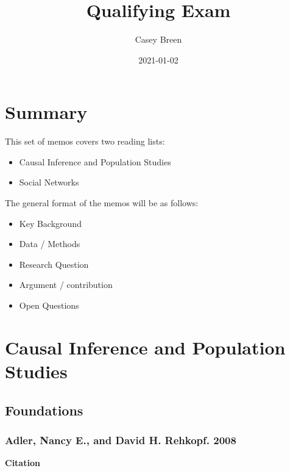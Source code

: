 \documentclass[
]{book}
\title{Qualifying Exam}
\author{Casey Breen}
\date{2021-01-02}
\providecommand{\tightlist}{%
  \setlength{\itemsep}{0pt}\setlength{\parskip}{0pt}}
\begin{document}
\maketitle

{
\setcounter{tocdepth}{1}
\tableofcontents
}
\hypertarget{summary}{%
\chapter{Summary}\label{summary}}

This set of memos covers two reading lists:

\begin{itemize}
\tightlist
\item
  Causal Inference and Population Studies
\item
  Social Networks
\end{itemize}

The general format of the memos will be as follows:

\begin{itemize}
\item
  Key Background
\item
  Data / Methods
\item
  Research Question
\item
  Argument / contribution
\item
  Open Questions
\end{itemize}

\hypertarget{causal-inference-and-population-studies}{%
\chapter{Causal Inference and Population Studies}\label{causal-inference-and-population-studies}}

\hypertarget{foundations}{%
\section{Foundations}\label{foundations}}

\hypertarget{adler-nancy-e.-and-david-h.-rehkopf.-2008}{%
\subsection*{Adler, Nancy E., and David H. Rehkopf. 2008}\label{adler-nancy-e.-and-david-h.-rehkopf.-2008}}

\textbf{Citation}
\end{document}
